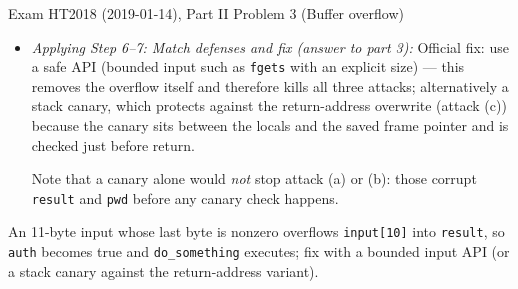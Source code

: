 \documentclass[12pt, a4paper]{article}
\begin{document}
\begin{practicebox}{Exam HT2018 (2019-01-14), Part II Problem 3 (Buffer overflow)}
\begin{itemize}
    \item \textit{Applying Step 6--7: Match defenses and fix (answer to part 3):} Official fix: use a safe API (bounded input such as \texttt{fgets} with an explicit size) --- this removes the overflow itself and therefore kills all three attacks; alternatively a stack canary, which protects against the return-address overwrite (attack (c)) because the canary sits between the locals and the saved frame pointer and is checked just before return.

    Note that a canary alone would \emph{not} stop attack (a) or (b): those corrupt \texttt{result} and \texttt{pwd} before any canary check happens.
\end{itemize}

\begin{answerbox}
An 11-byte input whose last byte is nonzero overflows \texttt{input[10]} into \texttt{result}, so \texttt{auth} becomes true and \texttt{do\_something} executes; fix with a bounded input API (or a stack canary against the return-address variant).
\end{answerbox}
\end{practicebox}
\end{document}
